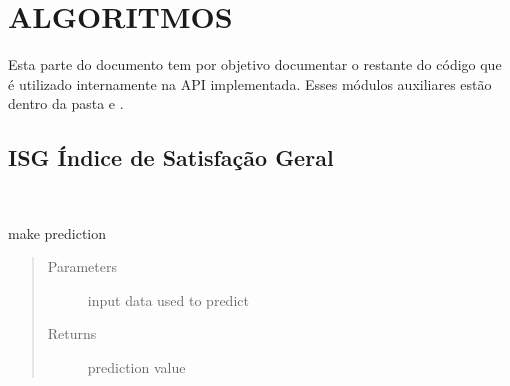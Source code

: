 \documentclass[letterpaper,10pt,english]{sphinxmanual}
\begin{document}
\section{ALGORITMOS}
\label{\detokenize{algorithms:algoritmos}}\label{\detokenize{algorithms::doc}}
\sphinxAtStartPar
Esta parte do documento tem por objetivo documentar o restante do código
que é utilizado internamente na API implementada. Esses módulos auxiliares
estão dentro da pasta  e .


\subsection{ISG \sphinxhyphen{} Índice de Satisfação Geral}
\label{\detokenize{algorithms:isg-indice-de-satisfacao-geral}}
\sphinxAtStartPar
{}

\label{\detokenize{algorithms:module-algorithms.isg.isg_predictor}}

\begin{fulllineitems}
\label{\detokenize{algorithms:algorithms.isg.isg_predictor.Predictor}}~

\begin{fulllineitems}
\label{\detokenize{algorithms:algorithms.isg.isg_predictor.Predictor.make_prediction}}
\sphinxAtStartPar
make prediction
\begin{quote}\begin{description}
\item[{Parameters}] \leavevmode
\sphinxAtStartPar
{} \textendash{} input data used to predict

\item[{Returns}] \leavevmode
\sphinxAtStartPar
prediction value

\end{description}\end{quote}

\end{fulllineitems}


\end{fulllineitems}
\end{document}
